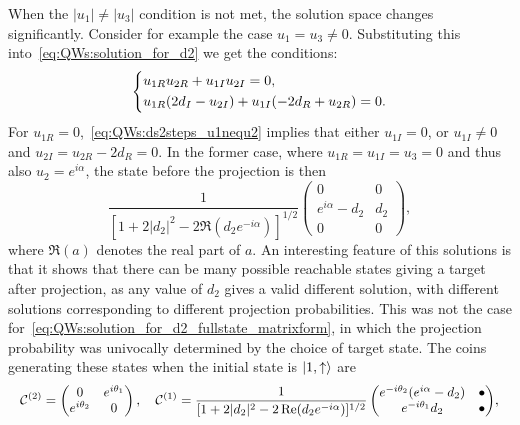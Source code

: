 When the $\lvert u_1 \rvert \neq \lvert u_3 \rvert$ condition is not met, the solution space changes significantly.
Consider for example the case $u_1 = u_3 \neq 0$. Substituting this into~\cref{eq:QWs:solution_for_d2} we get the conditions:
\begin{equation}
	\begin{dcases}
		u_{1R}u_{2R} + u_{1I} u_{2I} = 0, \\
		u_{1R} (2d_I - u_{2I})
		+ u_{1I} (-2 d_R + u_{2R}) = 0.
	\end{dcases}
    \label{eq:QWs:ds2steps_u1nequ2}
\end{equation}
For $u_{1R}=0$,~\cref{eq:QWs:ds2steps_u1nequ2} implies that either $u_{1I}=0$,
or $u_{1I}\neq0$ and $u_{2I}=u_{2R}-2d_R=0$.
In the former case, where $u_{1R}=u_{1I}=u_3=0$ and thus also $u_2=e^{i\alpha}$, the state before the projection is then
\begin{equation}
    \frac{1}{[1 + 2\lvert d_2\rvert^2 - 2\Re(d_2e^{-i\alpha})]^{1/2}}
    \begin{pmatrix}
        0 & 0 \\
        e^{i\alpha} - d_2 & d_2 \\
        0 & 0
    \end{pmatrix},
\end{equation}
where $\Re(a)$ denotes the real part of $a$.
An interesting feature of this solutions is that it shows that there can be many possible reachable states giving a target after projection, as any value of $d_2$ gives a valid different solution, with different solutions corresponding to different projection probabilities. This was not the case for~\cref{eq:QWs:solution_for_d2_fullstate_matrixform}, in which the projection probability was univocally determined by the choice of target state.
The coins generating these states when the initial state is $\ket{1,\uparrow}$ are
\begin{equation}
\scalemath{0.95}{
    \calC^{(2)} = \begin{pmatrix}
        0 & e^{i\theta_1} \\ e^{i\theta_2} & 0
    \end{pmatrix},
    \quad
    \calC^{(1)} =
    \frac{1}{[1 + 2\lvert d_2\rvert^2 - 2\Re(d_2e^{-i\alpha})]^{1/2}}
    \begin{pmatrix}
        e^{-i\theta_2} (e^{i\alpha} - d_2) & \bullet \\
        e^{-i\theta_1} d_2 & \bullet
    \end{pmatrix}
},
\end{equation}
